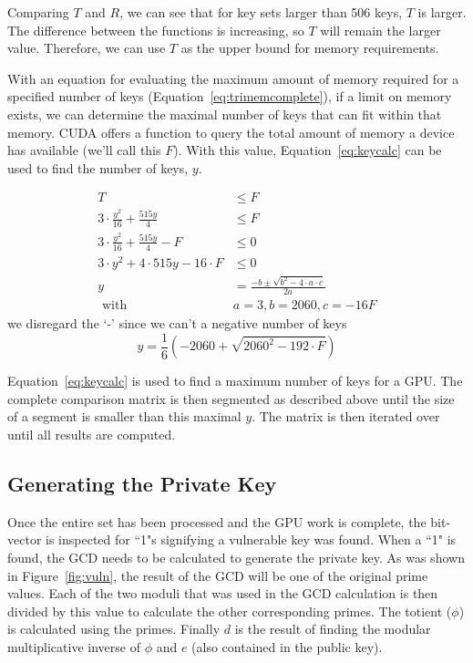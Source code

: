 \documentclass[12pt]{ucthesis}
\begin{document}
Comparing $T$ and $R$, we can see that for key sets larger than 506 keys, $T$ is larger. The difference between the functions is increasing, so $T$ will remain the larger value. Therefore, we can use $T$ as the upper bound for memory requirements. 

With an equation for evaluating the maximum amount of memory required for a specified number of keys (Equation~\ref{eq:trimemcomplete}), if a limit on memory exists, we can determine the maximal number of keys that can fit within that memory. CUDA offers a function to query the total amount of memory a device has available (we'll call this $F$). With this value, Equation~\ref{eq:keycalc} can be used to find the number of keys, $y$.

\begin{align*}
   T & \leq F\\
   3 \cdot \frac{y^2}{16} + \frac{515y}{4} & \leq F\\
   3 \cdot \frac{y^2}{16} + \frac{515y}{4} - F & \leq 0\\
   3 \cdot y^2 + 4\cdot515y- 16 \cdot F & \leq 0\\
   y & = \frac{-b \pm \sqrt{b^2 - 4 \cdot a \cdot c}}{2a}\\
   \text{ with } & a = 3, b = 2060, c = -16F
\end{align*}
\noindent we disregard the `-' since we can't a negative number of keys
\begin{equation}
   y = \frac{1}{6}\left(-2060 + \sqrt{2060^2 - 192 \cdot F}\right)
   \label{eq:keycalc}
\end{equation}

Equation~\ref{eq:keycalc} is used to find a maximum number of keys for a GPU. The complete comparison matrix is then segmented as described above until the size of a segment is smaller than this maximal $y$. The matrix is then iterated over until all results are computed.

\subsection{Generating the Private Key}
\label{subsec:private}
Once the entire set has been processed and the GPU work is complete, the bit-vector is inspected for ``1"s signifying a vulnerable key was found. When a ``1" is found, the GCD needs to be calculated to generate the private key. As was shown in Figure~\ref{fig:vuln}, the result of the GCD will be one of the original prime values. Each of the two moduli that was used in the GCD calculation is then divided by this value to calculate the other corresponding primes. The totient ($\phi$) is calculated using the primes. Finally $d$ is the result of finding the modular multiplicative inverse of $\phi$ and $e$ (also contained in the public key).
\end{document}
